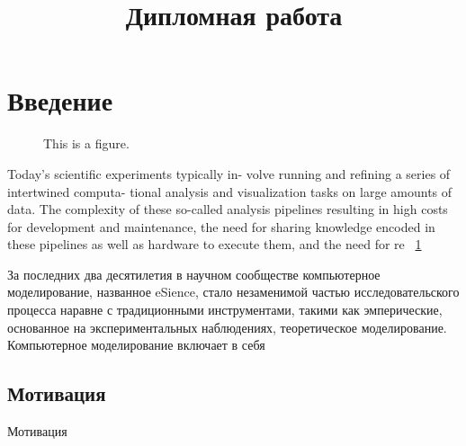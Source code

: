 \documentclass[a4paper,14pt]{article}
\title{Дипломная работа}
\begin{document}
\maketitle
\textwidth 15.5cm
\topmargin -1cm
\parindent 1cm
\textheight 24cm
\parskip 1.5mm



\section{Введение}

\begin{figure}[here]
\centering
{}
\caption{This is a figure.}\label{fig:petri1}
\end{figure}


Today’s scientific experiments typically in-
volve running and refining a series of intertwined computa-
tional analysis and visualization tasks on large amounts of
data. The complexity of these so-called analysis pipelines
resulting in high costs for development and maintenance,
the need for sharing knowledge encoded in these pipelines
as well as hardware to execute them, and the need for re
~\cref{fig:petri1}

За последних два десятилетия в научном сообществе компьютерное моделирование, названное eSience, стало незаменимой частью исследовательского процесса наравне с традиционными инструментами, такими как эмперические, основанное на  экспериментальных наблюдениях, теоретическое моделирование. Компьютерное моделирование включает в себя 

\subsection{Мотивация}
Мотивация
\end{document}
